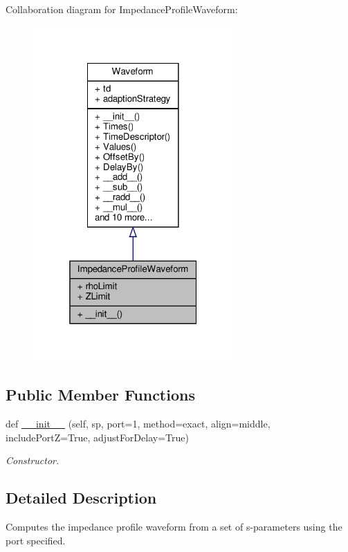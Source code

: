 Collaboration diagram for Impedance\+Profile\+Waveform\+:
\nopagebreak
\begin{figure}[H]
\begin{center}
\leavevmode
\includegraphics[width=217pt]{classSignalIntegrity_1_1ImpedanceProfile_1_1ImpedanceProfileWaveform_1_1ImpedanceProfileWaveform__coll__graph}
\end{center}
\end{figure}
\subsection*{Public Member Functions}
\begin{DoxyCompactItemize}
\item 
def \hyperlink{classSignalIntegrity_1_1ImpedanceProfile_1_1ImpedanceProfileWaveform_1_1ImpedanceProfileWaveform_a44c18ce4afb30f11f4cdb07bc0f0c6be}{\+\_\+\+\_\+init\+\_\+\+\_\+} (self, sp, port=1, method=\textquotesingle{}exact\textquotesingle{}, align=\textquotesingle{}middle\textquotesingle{}, include\+PortZ=True, adjust\+For\+Delay=True)
\begin{DoxyCompactList}\small\item\em Constructor. \end{DoxyCompactList}\end{DoxyCompactItemize}


\subsection{Detailed Description}
Computes the impedance profile waveform from a set of s-\/parameters using the port specified. 

